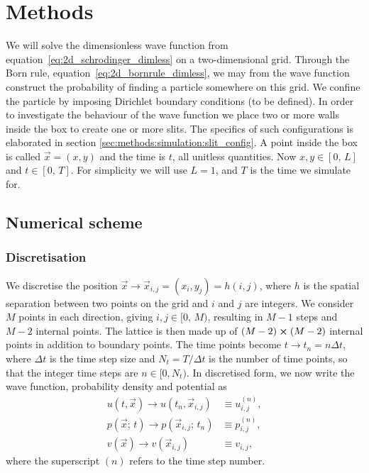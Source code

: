 
\section{Methods}\label{sec:methods}

We will solve the dimensionless wave function from equation~\eqref{eq:2d_schrodinger_dimless} on a two-dimensional grid. Through the Born rule, equation~\eqref{eq:2d_bornrule_dimless}, we may from the wave function construct the probability of finding a particle somewhere on this grid. We confine the particle by imposing Dirichlet boundary conditions (to be defined). In order to investigate the behaviour of the wave function we place two or more walls inside the box to create one or more slits. The specifics of such configurations is elaborated in section \ref{sec:methods:simulation:slit_config}. A point inside the box is called $\vec{x} =(x, y)$ and the time is $t$, all unitless quantities. Now $x, y \in [0,\,L]$ and $t\in[0,\,T]$. For simplicity we will use $L=1$, and $T$ is the time we simulate for. 

\subsection{Numerical scheme}\label{sec:methods:numerical_scheme}

    \subsubsection{Discretisation}\label{sec:methods:numerical_scheme:discretisation}
        We discretise the position $\vec{x} \to \vec{x}_{i,j} = (x_i, y_j) = h(i,j)$, where $h$ is the spatial separation between two points on the grid and $i$ and $j$ are integers. We consider $M$ points in each direction, giving $i, j \in [0,\, M)$, resulting in $M-1$ steps and $M-2$ internal points. The lattice is then made up of $(M-2) \cross (M-2)$ internal points in addition to boundary points. The time points become $t\to t_n=n\Delta t$, where $\Delta t$ is the time step size and $N_t = T/\Delta t$ is the number of time points, so that the integer time steps are $n\in[0, N_t)$. In discretised form, we now write the wave function, probability density and potential as 
        \begin{align}
            u(t, \vec{x}) \to u(t_n, \vec{x}_{i,j}) &\equiv u_{i,j}^{(n)}, \\ 
            p(\vec{x};\, t) \to p(\vec{x}_{i,j};\, t_n) &\equiv p_{i,j}^{(n)}, \\
            v(\vec{x}) \to v(\vec{x}_{i,j})&\equiv v_{i,j}, 
        \end{align}
        where the superscript $(n)$ refers to the time step number. 

